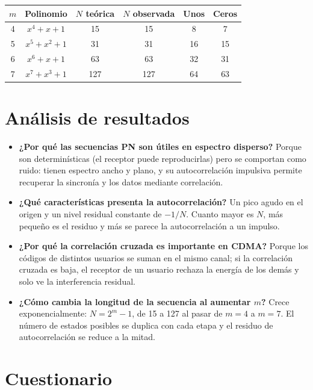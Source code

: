\documentclass[11pt,a4paper]{article}
\begin{document}
\begin{tabular}{@{}cccccc@{}}
  \toprule
  $m$ & Polinomio & $N$ teórica & $N$ observada & Unos & Ceros \\
  \midrule
  4 & $x^4+x+1$   & 15  & 15  & 8  & 7  \\
  5 & $x^5+x^2+1$ & 31  & 31  & 16 & 15 \\
  6 & $x^6+x+1$   & 63  & 63  & 32 & 31 \\
  7 & $x^7+x^3+1$ & 127 & 127 & 64 & 63 \\
  \bottomrule
\end{tabular}

\section{Análisis de resultados}

\begin{itemize}
  \item \textbf{¿Por qué las secuencias PN son útiles en espectro disperso?} Porque son
        determinísticas (el receptor puede reproducirlas) pero se comportan como ruido:
        tienen espectro ancho y plano, y su autocorrelación impulsiva permite recuperar la
        sincronía y los datos mediante correlación.
  \item \textbf{¿Qué características presenta la autocorrelación?} Un pico agudo en el
        origen y un nivel residual constante de $-1/N$. Cuanto mayor es $N$, más pequeño
        es el residuo y más se parece la autocorrelación a un impulso.
  \item \textbf{¿Por qué la correlación cruzada es importante en CDMA?} Porque los códigos
        de distintos usuarios se suman en el mismo canal; si la correlación cruzada es
        baja, el receptor de un usuario rechaza la energía de los demás y solo ve la
        interferencia residual.
  \item \textbf{¿Cómo cambia la longitud de la secuencia al aumentar $m$?} Crece
        exponencialmente: $N=2^m-1$, de 15 a 127 al pasar de $m=4$ a $m=7$. El número de
        estados posibles se duplica con cada etapa y el residuo de autocorrelación se
        reduce a la mitad.
\end{itemize}

\section{Cuestionario}
\end{document}
